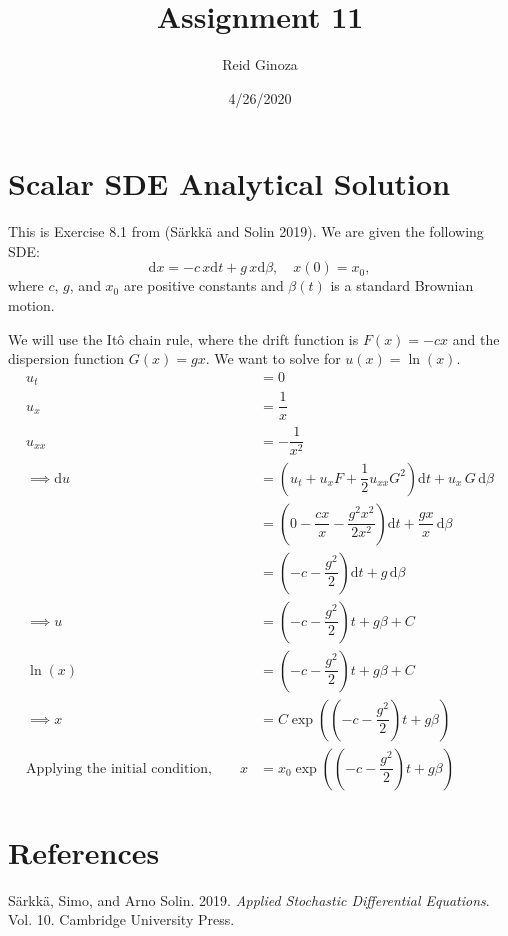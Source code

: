 \documentclass[]{article}
\title{Assignment 11}
\author{Reid Ginoza}
\date{4/26/2020}
\begin{document}
\maketitle

\hypertarget{scalar-sde-analytical-solution}{%
\section{Scalar SDE Analytical
Solution}\label{scalar-sde-analytical-solution}}

This is Exercise 8.1 from (Särkkä and Solin 2019). We are given the
following SDE: \begin{equation}
\mathrm{d}x = -c \, x \mathrm{d}t + g \, x \mathrm{d}\beta, \quad x(0) = x_0,
\end{equation} where \(c\), \(g\), and \(x_0\) are positive constants
and \(\beta (t)\) is a standard Brownian motion.

We will use the Itô chain rule, where the drift function is
\(F(x) = -cx\) and the dispersion function \(G(x) = gx\). We want to
solve for \(u(x) = \ln{\left( x\right)}\). \begin{align}
u_t &= 0\\
u_x &= \dfrac{1}{x}\\
u_{xx} &= - \dfrac{1}{x^2}\\
\implies \mathrm{d}u &= \left(u_t + u_x F + \dfrac{1}{2} u_{xx} G^2 \right) \mathrm{d}t + u_x \,G \,\mathrm{d}\beta\\
&=\left(0 - \dfrac{cx}{x} - \dfrac{g^2 x^2}{2x^2} \right) \mathrm{d}t + \dfrac{gx}{x} \, \mathrm{d}\beta\\
&=\left(- c - \dfrac{g^2}{2} \right) \mathrm{d}t + g \, \mathrm{d}\beta\\
\implies u &= \left(- c - \dfrac{g^2}{2} \right) t + g \beta + C\\
\ln{\left( x \right)} &= \left(- c - \dfrac{g^2}{2} \right) t + g \beta + C\\
\implies x &= C \exp{\left( \left(- c - \dfrac{g^2}{2} \right) t + g \beta \right)}\\
\text{Applying the initial condition,}\quad\quad x &= x_0 \exp{\left( \left(- c - \dfrac{g^2}{2} \right) t + g \beta \right)}
\end{align}

\hypertarget{references}{%
\section*{References}\label{references}}

\hypertarget{refs}{}
\leavevmode\hypertarget{ref-sarkka2019applied}{}%
Särkkä, Simo, and Arno Solin. 2019. \emph{Applied Stochastic
Differential Equations}. Vol. 10. Cambridge University Press.
\end{document}
